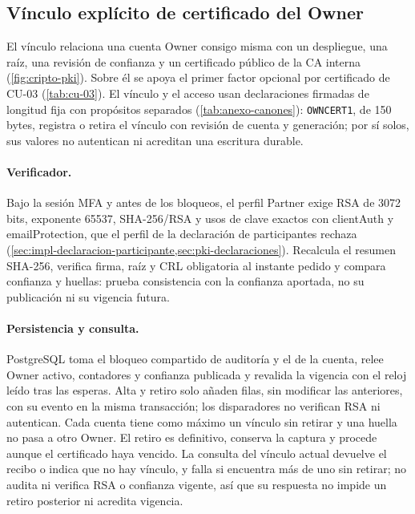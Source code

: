\subsection{Vínculo explícito de certificado del Owner}\label{sec:impl-vinculo-certificado}

El vínculo relaciona una cuenta Owner consigo misma con un despliegue, una raíz, una revisión de confianza y un certificado público de la CA interna (\cref{fig:cripto-pki}). Sobre él se apoya el primer factor opcional por certificado de CU-03 (\cref{tab:cu-03}). El vínculo y el acceso usan declaraciones firmadas de longitud fija con propósitos separados (\cref{tab:anexo-canones}): \texttt{OWNCERT1}, de 150 bytes, registra o retira el vínculo con revisión de cuenta y generación; por sí solos, sus valores no autentican ni acreditan una escritura durable.

\paragraph{Verificador.} Bajo la sesión MFA y antes de los bloqueos, el perfil Partner exige RSA de 3072 bits, exponente 65537, SHA-256/RSA y usos de clave exactos con clientAuth y emailProtection, que el perfil de la declaración de participantes rechaza (\cref{sec:impl-declaracion-participante,sec:pki-declaraciones}). Recalcula el resumen SHA-256, verifica firma, raíz y CRL obligatoria al instante pedido y compara confianza y huellas: prueba consistencia con la confianza aportada, no su publicación ni su vigencia futura.

\paragraph{Persistencia y consulta.} PostgreSQL toma el bloqueo compartido de auditoría y el de la cuenta, relee Owner activo, contadores y confianza publicada y revalida la vigencia con el reloj leído tras las esperas. Alta y retiro solo añaden filas, sin modificar las anteriores, con su evento en la misma transacción; los disparadores no verifican RSA ni autentican. Cada cuenta tiene como máximo un vínculo sin retirar y una huella no pasa a otro Owner. El retiro es definitivo, conserva la captura y procede aunque el certificado haya vencido. La consulta del vínculo actual devuelve el recibo o indica que no hay vínculo, y falla si encuentra más de uno sin retirar; no audita ni verifica RSA o confianza vigente, así que su respuesta no impide un retiro posterior ni acredita vigencia.

